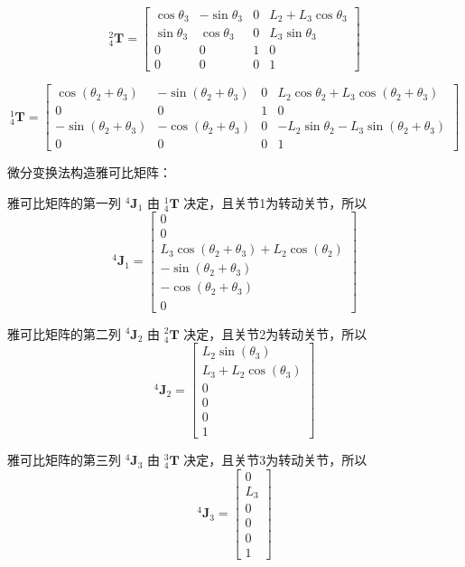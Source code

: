 \documentclass{homework}
\begin{document}
\begin{sol}
\[
  _4^2\mathbf{T} =
  \begin{bmatrix}
    \cos\theta_3 & -\sin\theta_3 & 0 & L_2 + L_3 \cos\theta_3 \\
    \sin\theta_3 & \cos\theta_3 & 0 & L_3 \sin\theta_3 \\
    0 & 0 & 1 & 0 \\
    0 & 0 & 0 & 1
  \end{bmatrix}
\]

\[
  _4^1\mathbf{T} =
  \begin{bmatrix}
    \cos(\theta_2 + \theta_3) & -\sin(\theta_2 + \theta_3) & 0 & L_2 \cos\theta_2 + L_3 \cos(\theta_2 + \theta_3) \\
    0 & 0 & 1 & 0 \\
    -\sin(\theta_2 + \theta_3) & -\cos(\theta_2 + \theta_3) & 0 & -L_2 \sin\theta_2 - L_3 \sin(\theta_2 + \theta_3) \\
    0 & 0 & 0 & 1
  \end{bmatrix}
\]

微分变换法构造雅可比矩阵：

雅可比矩阵的第一列 $ {^4}\mathbf{J}_1 $ 由 $ _4^1\mathbf{T} $ 决定，且关节1为转动关节，所以
\[
  {^4}\mathbf{J}_1 =
  \begin{bmatrix}
    0 \\
    0 \\
    L_3 \cos(\theta_2 + \theta_3) + L_2 \cos(\theta_2) \\
    -\sin(\theta_2 + \theta_3) \\
    -\cos(\theta_2 + \theta_3) \\
    0
  \end{bmatrix}
\]

雅可比矩阵的第二列 $ {^4}\mathbf{J}_2 $ 由 $ _4^2\mathbf{T} $ 决定，且关节2为转动关节，所以
\[
  {^4}\mathbf{J}_2 =
  \begin{bmatrix}
    L_2 \sin(\theta_3) \\
    L_3 + L_2 \cos(\theta_3) \\
    0 \\
    0 \\
    0 \\
    1
  \end{bmatrix}
\]

雅可比矩阵的第三列 $ {^4}\mathbf{J}_3 $ 由 $ _4^3\mathbf{T} $ 决定，且关节3为转动关节，所以
\[
  {^4}\mathbf{J}_3 =
  \begin{bmatrix}
    0 \\
    L_3 \\
    0 \\
    0 \\
    0 \\
    1
  \end{bmatrix}
\]


\end{sol}
\end{document}
